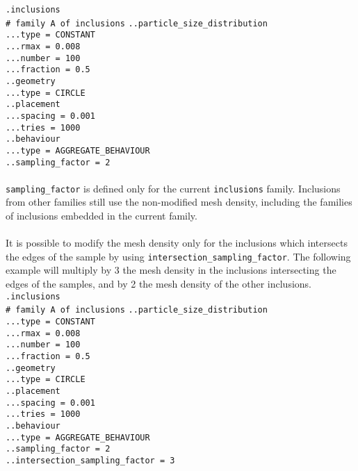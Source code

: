 \documentclass[10pt]{article}
\begin{document}
\noindent \verb+.inclusions+\\
\verb+# family A of inclusions+
\verb+..particle_size_distribution+\\
\verb+...type = CONSTANT+\\
\verb+...rmax = 0.008+\\
\verb+...number = 100+\\
\verb+...fraction = 0.5+\\
\verb+..geometry+\\
\verb+...type = CIRCLE+\\
\verb+..placement+\\
\verb+...spacing = 0.001+\\
\verb+...tries = 1000+\\
\verb+..behaviour+\\
\verb+...type = AGGREGATE_BEHAVIOUR+\\
\verb+..sampling_factor = 2+

\paragraph{} \verb+sampling_factor+ is defined only for the current \verb+inclusions+ family. Inclusions from other families still use the non-modified mesh density, including the families of inclusions embedded in the current family.

\paragraph{} It is possible to modify the mesh density only for the inclusions which intersects the edges of the sample by using \verb+intersection_sampling_factor+. The following example will multiply by 3 the mesh density in the inclusions intersecting the edges of the samples, and by 2 the mesh density of the other inclusions.\\

\noindent \verb+.inclusions+\\
\verb+# family A of inclusions+
\verb+..particle_size_distribution+\\
\verb+...type = CONSTANT+\\
\verb+...rmax = 0.008+\\
\verb+...number = 100+\\
\verb+...fraction = 0.5+\\
\verb+..geometry+\\
\verb+...type = CIRCLE+\\
\verb+..placement+\\
\verb+...spacing = 0.001+\\
\verb+...tries = 1000+\\
\verb+..behaviour+\\
\verb+...type = AGGREGATE_BEHAVIOUR+\\
\verb+..sampling_factor = 2+\\
\verb+..intersection_sampling_factor = 3+
\end{document}
